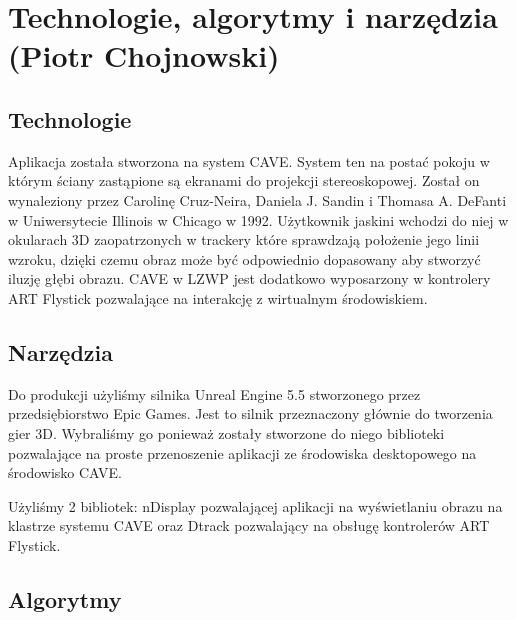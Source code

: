 \chapter{Technologie, algorytmy i narzędzia (Piotr Chojnowski)}
\label{chap:algs}

\section{Technologie}
Aplikacja została stworzona na system CAVE. System ten na postać pokoju w którym ściany zastąpione są ekranami do projekcji stereoskopowej. Został on wynaleziony przez Carolinę Cruz-Neira, Daniela J. Sandin i Thomasa A. DeFanti w Uniwersytecie Illinois w Chicago w 1992. Użytkownik jaskini wchodzi do niej w okularach 3D zaopatrzonych w trackery które sprawdzają położenie jego linii wzroku, dzięki czemu obraz może być odpowiednio dopasowany aby stworzyć iluzję głębi obrazu. CAVE w LZWP jest dodatkowo wyposarzony w kontrolery ART Flystick pozwalające na interakcję z wirtualnym środowiskiem.


\section{Narzędzia}
Do produkcji użyliśmy silnika Unreal Engine 5.5 stworzonego przez przedsiębiorstwo Epic Games. Jest to silnik przeznaczony głównie do tworzenia gier 3D. Wybraliśmy go ponieważ zostały stworzone do niego biblioteki pozwalające na proste przenoszenie aplikacji ze środowiska desktopowego na środowisko CAVE.

Użyliśmy 2 bibliotek: nDisplay pozwalającej aplikacji na wyświetlaniu obrazu na klastrze systemu CAVE oraz Dtrack pozwalający na obsługę kontrolerów ART Flystick.

\section{Algorytmy}